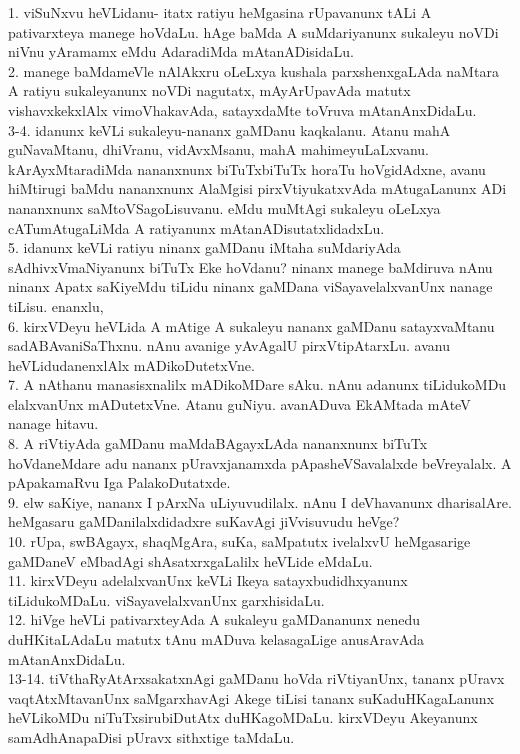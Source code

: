 \documentclass{article}
\begin{document}
1. viSuNxvu heVLidanu- itatx ratiyu heMgasina rUpavanunx tALi A pativarxteya manege hoVdaLu. hAge baMda A suMdariyanunx sukaleyu noVDi niVnu yAramamx eMdu AdaradiMda mAtanADisidaLu.\\
2. manege baMdameVle nAlAkxru oLeLxya kushala parxshenxgaLAda naMtara A ratiyu sukaleyanunx noVDi nagutatx, mAyArUpavAda matutx vishavxkekxlAlx vimoVhakavAda, satayxdaMte toVruva mAtanAnxDidaLu.\\
3-4. idanunx keVLi sukaleyu-nananx gaMDanu kaqkalanu. Atanu mahA guNavaMtanu, dhiVranu, vidAvxMsanu, mahA mahimeyuLaLxvanu. kArAyxMtaradiMda nananxnunx biTuTxbiTuTx horaTu hoVgidAdxne, avanu hiMtirugi baMdu nananxnunx AlaMgisi pirxVtiyukatxvAda mAtugaLanunx ADi nananxnunx saMtoVSagoLisuvanu. eMdu muMtAgi sukaleyu oLeLxya cATumAtugaLiMda A ratiyanunx mAtanADisutatxlidadxLu.\\
5. idanunx keVLi ratiyu ninanx gaMDanu iMtaha suMdariyAda sAdhivxVmaNiyanunx biTuTx Eke hoVdanu? ninanx manege baMdiruva nAnu ninanx Apatx saKiyeMdu tiLidu ninanx gaMDana viSayavelalxvanUnx nanage tiLisu. enanxlu,\\
6. kirxVDeyu heVLida A mAtige A sukaleyu nananx gaMDanu satayxvaMtanu sadABAvaniSaThxnu. nAnu avanige yAvAgalU pirxVtipAtarxLu. avanu heVLidudanenxlAlx mADikoDutetxVne.\\
7. A nAthanu manasisxnalilx mADikoMDare sAku. nAnu adanunx tiLidukoMDu elalxvanUnx mADutetxVne. Atanu guNiyu. avanADuva EkAMtada mAteV nanage hitavu.\\
8. A riVtiyAda gaMDanu maMdaBAgayxLAda nananxnunx biTuTx hoVdaneMdare adu nananx pUravxjanamxda pApasheVSavalalxde beVreyalalx. A pApakamaRvu Iga PalakoDutatxde.\\
9. elw saKiye, nananx I pArxNa uLiyuvudilalx. nAnu I deVhavanunx dharisalAre. heMgasaru gaMDanilalxdidadxre suKavAgi jiVvisuvudu heVge?\\
10. rUpa, swBAgayx, shaqMgAra, suKa, saMpatutx ivelalxvU heMgasarige gaMDaneV eMbadAgi shAsatxrxgaLalilx heVLide eMdaLu.\\
11. kirxVDeyu adelalxvanUnx keVLi Ikeya satayxbudidhxyanunx tiLidukoMDaLu. viSayavelalxvanUnx garxhisidaLu.\\
12. hiVge heVLi pativarxteyAda A sukaleyu gaMDananunx nenedu duHKitaLAdaLu matutx tAnu mADuva kelasagaLige anusAravAda mAtanAnxDidaLu.\\
13-14. tiVthaRyAtArxsakatxnAgi gaMDanu hoVda riVtiyanUnx, tananx pUravx vaqtAtxMtavanUnx saMgarxhavAgi Akege tiLisi tananx suKaduHKagaLanunx heVLikoMDu niTuTxsirubiDutAtx duHKagoMDaLu. kirxVDeyu Akeyanunx samAdhAnapaDisi pUravx sithxtige taMdaLu.\\
\end{document}
